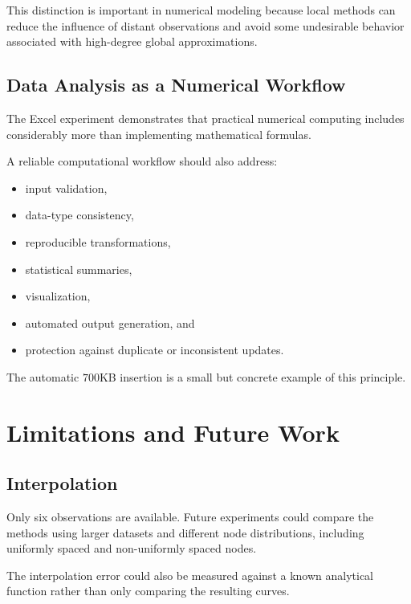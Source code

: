 \documentclass[11pt,a4paper]{article}
\begin{document}
This distinction is important in numerical modeling because local methods
can reduce the influence of distant observations and avoid some undesirable
behavior associated with high-degree global approximations.

\subsection{Data Analysis as a Numerical Workflow}

The Excel experiment demonstrates that practical numerical computing
includes considerably more than implementing mathematical formulas.

A reliable computational workflow should also address:

\begin{itemize}
    \item input validation,
    \item data-type consistency,
    \item reproducible transformations,
    \item statistical summaries,
    \item visualization,
    \item automated output generation, and
    \item protection against duplicate or inconsistent updates.
\end{itemize}

The automatic $700$KB insertion is a small but concrete example of this
principle.


\section{Limitations and Future Work}

\subsection{Interpolation}

Only six observations are available. Future experiments could compare the
methods using larger datasets and different node distributions, including
uniformly spaced and non-uniformly spaced nodes.

The interpolation error could also be measured against a known analytical
function rather than only comparing the resulting curves.
\end{document}
